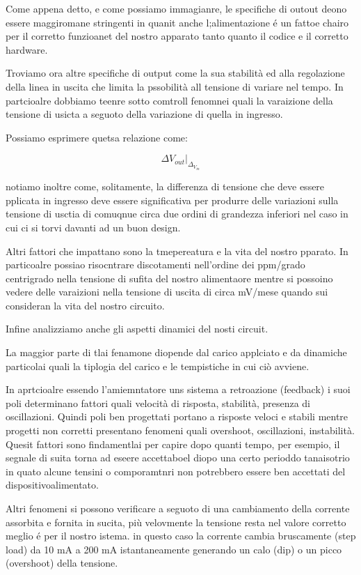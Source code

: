 \documentclass[../main.tex]{subfiles}
\begin{document}
Come appena detto, e come possiamo immagianre, le specifiche di outout deono essere maggiromane stringenti in quanit anche l;alimentazione é un fattoe chairo per il corretto funzioanet del nostro apparato tanto quanto il codice e il corretto hardware. 

Troviamo ora altre specifiche di output come la sua stabilità ed alla regolazione della linea in uscita che limita la pssobilità all tensione di variare nel tempo.
In partcioalre dobbiamo teenre sotto comtroll fenomnei quali la varaizione della tensione di usicta a seguoto della variazione di quella in ingresso.

Possiamo esprimere quetsa relazione come:

\begin{equation}
	\Delta V_{out} \big|_{\Delta_{V_{in}}}
\end{equation}

notiamo inoltre come, solitamente, la differenza di tensione che deve essere pplicata in ingresso deve essere significativa per produrre delle variazioni sulla tensione di usctia di comuqnue circa due ordini di grandezza inferiori nel caso in cui ci si torvi davanti ad un buon design.

Altri fattori che impattano sono la tmepereatura e la vita del nostro pparato.
In particoalre possiao risocntrare discotamenti nell'ordine dei ppm/grado centrigrado nella tensione di sufita del nostro alimentaore mentre si possoino vedere delle varaizioni nella tensione di uscita di circa mV/mese quando sui consideran la vita del nostro circuito.

Infine analizziamo anche gli aspetti dinamici del nosti circuit.

La maggior parte di tlai fenamone diopende dal carico applciato e da dinamiche particolai quali la tiplogia del carico e le tempistiche in cui ciò avviene.

In aprtcioalre essendo l'amiemntatore uns sistema a retroazione (feedback) i suoi poli determinano fattori quali velocità di risposta, stabilità, presenza di oscillazioni.
Quindi poli ben progettati portano a risposte veloci e stabili mentre progetti non corretti presentano fenomeni quali overshoot, oscillazioni, instabilità. Quesit fattori sono findamentlai per capire dopo quanti tempo, per esempio, il segnale di suita torna ad eseere accettaboel diopo una certo perioddo tanaisotrio in quato alcune tensini o comporamtnri non potrebbero essere ben accettati del dispositivoalimentato.

Altri fenomeni si possono verificare a seguoto di una cambiamento della corrente assorbita e fornita in sucita, più velovmente la tensione resta nel valore corretto meglio é per il nostro istema. in questo caso la corrente cambia bruscamente (step load) da 10 mA a 200 mA istantaneamente generando un calo (dip) o un picco (overshoot) della tensione.
\end{document}
